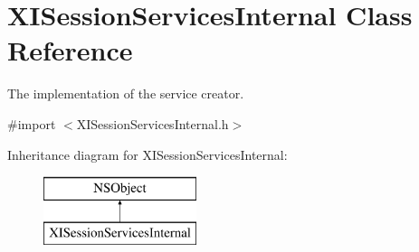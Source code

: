 \hypertarget{interface_x_i_session_services_internal}{}\section{X\+I\+Session\+Services\+Internal Class Reference}
\label{interface_x_i_session_services_internal}


The implementation of the service creator.  




{\ttfamily \#import $<$X\+I\+Session\+Services\+Internal.\+h$>$}

Inheritance diagram for X\+I\+Session\+Services\+Internal\+:\begin{figure}[H]
\begin{center}
\leavevmode
\includegraphics[height=2.000000cm]{interface_x_i_session_services_internal}
\end{center}
\end{figure}
